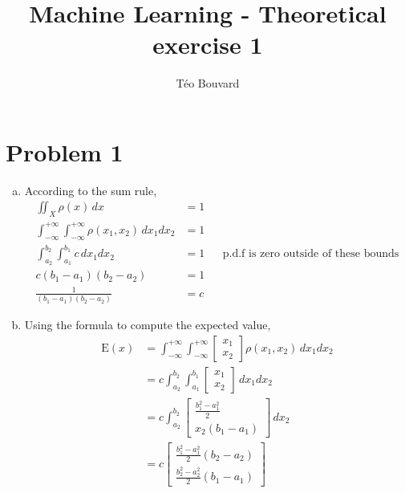 \documentclass[a4paper, 10pt, twoside]{article}
\begin{document}
\title{Machine Learning - Theoretical exercise 1}
\author{T\'eo Bouvard}
\maketitle

\section*{Problem 1}
\begin{enumerate}[a)]
    \item According to the sum rule,
          \begin{align*}
              \iint_X \rho(x) \,dx                                                       & = 1                                                   \\
              \int_{-\infty}^{+\infty}\int_{-\infty}^{+\infty} \rho(x_1, x_2) \,dx_1dx_2 & = 1                                                   \\
              \int_{a_2}^{b_2}\int_{a_1}^{b_1} c \,dx_1dx_2                              & = 1 &  & \text{p.d.f is zero outside of these bounds} \\
              c(b_1-a_1)(b_2-a_2)                                                        & = 1                                                   \\
              \frac{1}{(b_1-a_1)(b_2-a_2)}                                               & = c
          \end{align*}

    \item Using the formula to compute the expected value,
          \begin{align*}
              \mathrm{E}(x) & = \int_{-\infty}^{+\infty}\int_{-\infty}^{+\infty} \begin{bmatrix} x_1 \\ x_2 \end{bmatrix}\rho(x_1, x_2) \,dx_1dx_2 \\
                            & = c \int_{a_2}^{b_2}\int_{a_1}^{b_1} \begin{bmatrix} x_1 \\ x_2 \end{bmatrix} \,dx_1dx_2                             \\
                            & = c \int_{a_2}^{b_2} \begin{bmatrix} \frac{b_1^2 - a_1^2}{2} \\ x_2(b_1-a_1) \end{bmatrix} \,dx_2                                                 \\
                            & = c\begin{bmatrix} \frac{b_1^2 - a_1^2}{2}(b_2-a_2) \\ \frac
                  {b_2^2 - a_2^2}{2}(b_1-a_1)\end{bmatrix}
          \end{align*}


\end{enumerate}
\end{document}
